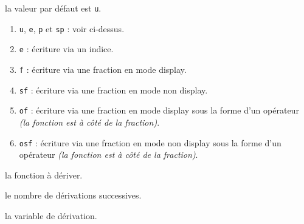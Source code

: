 \documentclass[12pt,a4paper]{article}
\begin{document}

\IDoption{} la valeur par défaut est \verb+u+. 
\begin{enumerate}
	\item \verb+u+, \verb+e+, \verb+p+ et \verb+sp+ : voir  ci-dessus.

	\item \verb+e+ : écriture via un indice.

	\item \verb+f+ : écriture via une fraction en mode display.

	\item \verb+sf+ : écriture via une fraction en mode non display.

	\item \verb+of+ : écriture via une fraction en mode display sous la forme d'un opérateur \emph{(la fonction est à côté de la fraction)}.

	\item \verb+osf+ : écriture via une fraction en mode non display sous la forme d'un opérateur \emph{(la fonction est à côté de la fraction)}.
\end{enumerate}


 la fonction à dériver.

 le nombre de dérivations successives.

 la variable de dérivation.
\end{document}
